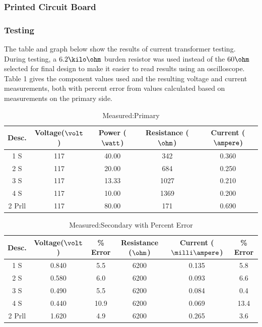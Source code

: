 \subsubsection{Printed Circuit Board}

\subsubsection{Testing}
The table and graph below show the results of current transformer testing. During testing, a $6.2\kilo\ohm$ burden resistor was used instead of the $60 \ohm$ selected for final design to make it easier to read results using an oscilloscope. Table 1 gives the component values used and the resulting voltage and current measurements, both with percent error from values calculated based on measurements on the primary side. 

\begin{table}[htdp]
\caption{Measured:Primary}
\begin{center}
\begin{tabular}{|c|c|c|c|c|} \hline
Desc. & Voltage($\volt$) & Power ($\watt$) & Resistance ($\ohm$) & Current ($\ampere$) \\ \hline
1 S & 117 & 40.00 & 342 & 0.360 \\ \hline
2 S & 117 & 20.00 & 684 & 0.250 \\ \hline
3 S & 117 & 13.33 & 1027 & 0.210 \\ \hline
4 S & 117 & 10.00 & 1369 & 0.200 \\ \hline
2 Prll & 117 & 80.00 & 171 & 0.690 \\ \hline
\end{tabular}
\end{center}
\label{tab:measured_primary}
\end{table}%

\begin{table}[htdp]
\caption{Measured:Secondary with Percent Error}
\begin{center}
\begin{tabular}{|c|c|c|c|c|c|} \hline
Desc. & Voltage($\volt$) & \% Error & Resistance ($\ohm$) & Current ($\milli\ampere$) & \% Error \\ \hline
1 S & 0.840 & 5.5 & 6200 & 0.135 & 5.8 \\ \hline
2 S & 0.580 & 6.0 & 6200 & 0.093 & 6.6 \\ \hline
3 S & 0.490 & 5.5 & 6200 & 0.084 & 0.4 \\ \hline
4 S & 0.440 & 10.9 &6200 & 0.069 & 13.4 \\ \hline
2 Prll & 1.620 & 4.9 & 6200 & 0.265 & 3.6 \\ \hline
\end{tabular}
\end{center}
\label{tab:measured_secondaryPercentError}
\end{table}%

